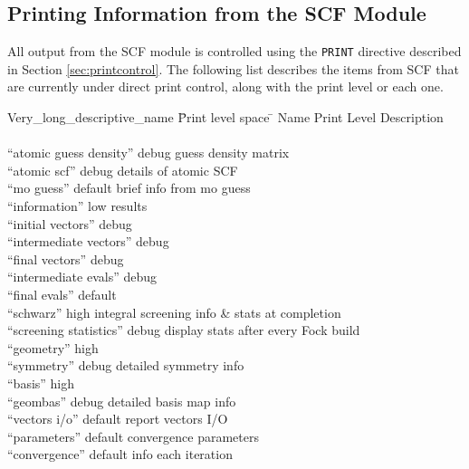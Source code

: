 

\subsection{Printing Information from the SCF Module}

All output from the SCF module is controlled using the \verb+PRINT+
directive described in Section \ref{sec:printcontrol}.  The following 
list describes the items from SCF that are currently under direct 
print control, along with the print level or each one.

\begin{tabbing}
  Very\_long\_descriptive\_name \= Print level space \= \kill
  Name                    \> Print Level \> Description \\
                          \>        \> \\
 ``atomic guess density'' \> debug  \> guess density matrix \\
 ``atomic scf''           \> debug  \> details of atomic SCF \\
 ``mo guess''             \> default\> brief info from mo guess \\
 ``information''          \> low    \> results  \\
 ``initial vectors''      \> debug  \> \\
 ``intermediate vectors'' \> debug  \> \\
 ``final vectors''        \> debug  \> \\
 ``intermediate evals''   \> debug  \> \\
 ``final evals''          \> default\> \\
 ``schwarz''              \> high   \> integral screening info \&
  stats at completion\\
 ``screening statistics'' \> debug  \> display stats after every Fock build \\
 ``geometry''             \> high   \> \\
 ``symmetry''             \> debug  \> detailed symmetry info \\
 ``basis''                \> high   \> \\
 ``geombas''              \> debug  \> detailed basis map info \\
 ``vectors i/o''          \> default\> report vectors I/O \\
 ``parameters''           \> default\> convergence parameters \\
 ``convergence''          \> default\> info each iteration
\end{tabbing}

